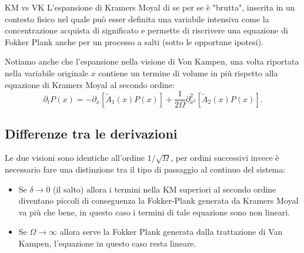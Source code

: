 \begin{redbox}{KM vs VK}
    L'espansione di Kramers Moyal di se per se è "brutta", inserita in un contesto fisico nel quale può esser definita una variabile intensiva come la concentrazione acquista di significato e permette di riscrivere una equazione di Fokker Plank anche per un processo a salti (sotto le opportune ipotesi).
\end{redbox}
\noindent
Notiamo anche che l'espansione nella visione di Von Kampen, una volta riportata nella variabile originale $x$ contiene un termine di volume in più rispetto alla equazione di Kramers Moyal al secondo ordine:
\[
    \partial_{t}P(x) = - \partial_{x} \left[\tilde{A}_1(x) P(x) \right] + \frac{1}{2\Omega} \partial^2_{x^2} \left[\tilde{A}_2(x) P(x)\right]
.\] 
\subsection{Differenze tra le derivazioni}%
\label{sub:Differenze fisiche tra Kramers Moyal e Van Kampen}
Le due visioni sono identiche all'ordine $1 /\sqrt{\Omega}$, per ordini successivi invece è necessario fare una distinzione tra il tipo di passaggio al continuo del sistema:
\begin{itemize}
    \item Se $\delta\to 0$ (il salto) allora i termini nella KM superiori al secondo ordine diventano piccoli di conseguenza la Fokker-Plank generata da Kramers Moyal va più che bene, in questo caso i termini di tale equazione sono non lineari.
    \item Se $\Omega\to \infty$ allora serve la Fokker Plank generata dalla trattazione di Van Kampen, l'equazione in questo caso resta lineare.
\end{itemize}
